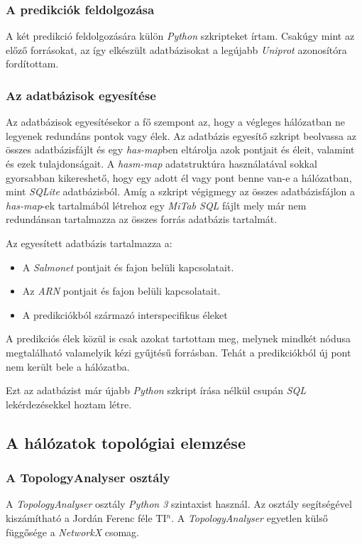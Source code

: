 \documentclass[a4paper,12pt]{article}
\begin{document}
			\subsubsection{A predikciók feldolgozása}
			A két predikció feldolgozására külön \textit{Python} szkripteket írtam. Csakúgy mint az előző forrásokat, az így elkészült adatbázisokat a legújabb \textit{Uniprot} azonosítóra fordítottam.




	\subsubsection{Az adatbázisok egyesítése}
		Az adatbázisok egyesítésekor a fő szempont az, hogy a végleges hálózatban ne legyenek redundáns pontok vagy élek. Az adatbázis egyesítő szkript beolvassa az összes adatbázisfájlt és egy \textit{has-map}ben eltárolja azok pontjait és éleit, valamint és ezek tulajdonságait. A \textit{hasm-map} adatstruktúra használatával sokkal gyorsabban kikereshető, hogy egy adott él vagy pont benne van-e a hálózatban, mint \textit{SQLite} adatbázisból. Amíg a szkript végigmegy az összes adatbázisfájlon a \textit{has-map}-ek tartalmából létrehoz egy \textit{MiTab SQL} fájlt mely már nem redundánsan tartalmazza az összes forrás adatbázis tartalmát.

		Az egyesített adatbázis tartalmazza a:
		\begin{itemize}
			\item A \textit{Salmonet} pontjait és fajon belüli kapcsolatait.
			\item Az \textit{ARN} pontjait és fajon belüli kapcsolatait.
			\item A predikciókból származó interspecifikus éleket
		\end{itemize}

		 A predikciós élek közül is csak azokat tartottam meg, melynek mindkét nódusa megtalálható valamelyik kézi gyűjtésű forrásban. Tehát a predikciókból új pont nem került bele a hálózatba.

		Ezt az adatbázist már újabb \textit{Python} szkript írása nélkül csupán \textit{SQL} lekérdezésekkel hoztam létre.

	\subsection{A hálózatok topológiai elemzése}

		\subsubsection{A TopologyAnalyser osztály}
		A \textit{TopologyAnalyser} osztály \textit{Python 3} szintaxist használ. Az osztály segítségével kiszámítható a Jordán Ferenc féle TI$^n$. A \textit{TopologyAnalyser} egyetlen külső függősége a \textit{NetworkX} csomag.
\end{document}
